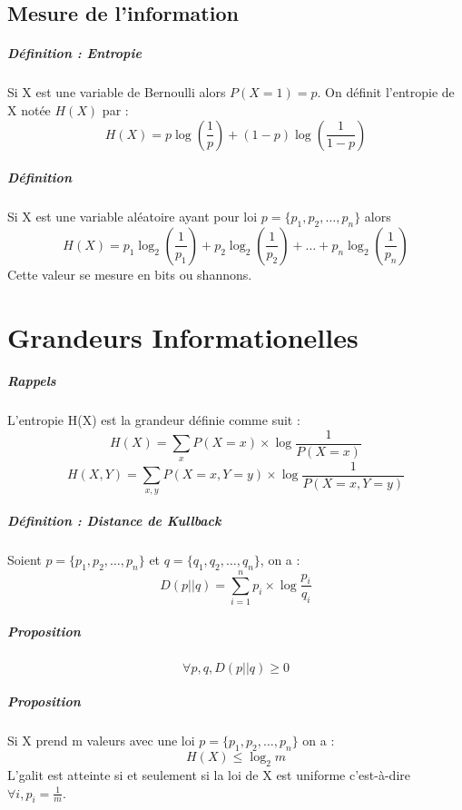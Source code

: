 \documentclass[12pt,a4paper]{report}
\begin{document}
\section{Mesure de l'information}
\paragraph{Définition : Entropie\\}
Si X est une variable de Bernoulli alors $ P(X=1) = p $. On définit l'entropie de X notée $H(X)$ par : 
$$ H(X) = p \log\left(\frac{1}{p}\right) + (1-p) \log\left(\frac{1}{1-p}\right) $$
\paragraph{Définition\\}
Si X est une variable aléatoire ayant pour loi $p=\{p_1,p_2,\ldots,p_n\} $ alors 
$$ H(X) = p_1 \log_2\left(\frac{1}{p_1}\right) + p_2 \log_2\left(\frac{1}{p_2}\right) + \ldots + p_n \log_2\left(\frac{1}{p_n}\right) $$
Cette valeur se mesure en bits ou shannons.
\chapter{Grandeurs Informationelles}
\paragraph{Rappels\\}
L'entropie H(X) est la grandeur définie comme suit :
$$ H(X)= \sum_{x}P(X=x) \times \log \frac{1}{P(X=x)} $$
$$ H(X,Y)= \sum_{x,y}P(X=x,Y=y) \times \log \frac{1}{P(X=x,Y=y)} $$
\paragraph{Définition : Distance de Kullback\\}
Soient $p=\{p_1,p_2,\ldots,p_n\}$ et $q=\{q_1,q_2,\ldots,q_n\}$, on a :
$$ D(p||q)=\sum_{i=1}^{n}p_i\times \log \frac{p_i}{q_i} $$
\paragraph{Proposition\\}
$$\forall p,q, D(p||q) \geqslant 0 $$
\paragraph{Proposition\\}
Si X prend m valeurs avec une loi $p=\{p_1,p_2,\ldots,p_n\}$ on a :\\
$$ H(X) \leqslant \log_2 m $$ 
L'galit est atteinte si et seulement si la loi de X est uniforme c'est-à-dire $ \forall i, p_i=\frac{1}{m}$.
\end{document}
